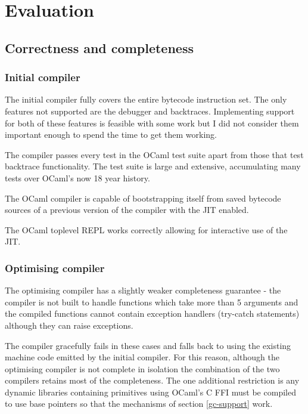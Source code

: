 \chapter{Evaluation}

\section{Correctness and completeness}

\subsection{Initial compiler}

The initial compiler fully covers the entire bytecode instruction set. The only features not
supported are
the debugger and backtraces. Implementing support for both of these features is feasible with some
work but
I did not consider them important enough to spend the time to get them working.

The compiler passes every test in the OCaml test suite apart from those that test backtrace
functionality. The test suite is large and extensive, accumulating many tests over OCaml's now
18 year history.

The OCaml compiler is capable of bootstrapping itself from saved bytecode sources
of a previous version of the compiler with the JIT enabled.

The OCaml toplevel REPL works correctly allowing for interactive use of the JIT.

\subsection{Optimising compiler} \label{eval-opt-comp-qual}

The optimising compiler has a slightly weaker completeness guarantee - the compiler is not built to
handle functions which take more than 5 arguments and the compiled functions cannot contain
exception
handlers (try-catch statements) although they can raise exceptions.

The compiler gracefully fails in these cases and falls back to using the existing machine code
emitted
by the initial compiler. For this reason, although the optimising compiler is not complete in
isolation
the combination of the two compilers retains most of the completeness. The one additional
restriction
is any dynamic libraries containing primitives using OCaml's C FFI must be compiled to use base
pointers
so that the mechanisms of section \ref{gc-support} work.

